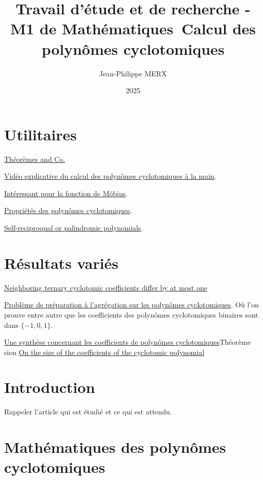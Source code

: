 \documentclass{article}
\newcounter{question}
\theoremstyle{break}                  %
\begin{document}
\title{Travail d'étude et de recherche - M1 de Mathématiques\
Calcul des polynômes cyclotomiques}
\author{Jean-Philippe MERX}
\date{2025}

\maketitle

\section*{Utilitaires}
\href{https://tex.stackexchange.com/questions/204411/getting-examples-to-look-like-theorems-lemmas-corollaries}{Théorèmes and Co.}


\href{https://www.youtube.com/watch?v=RLdHp_PB_x0}{Vidéo explicative du calcul des polynômes cyclotomiques à la main}.

\href{https://www.youtube.com/watch?v=gnBbm78jz0Y}{Intéressant pour la fonction de Möbius}.

\href{https://jacquescellier.fr/maths/polynomes_cyclotomiques.pdf}{Propriétés des polynômes cyclotomiques}.

\href{https://en.wikipedia.org/wiki/Reciprocal_polynomial}{Self-reciproqual or palindromic polynomials}.

\section*{Résultats variés}
\href{https://arxiv.org/pdf/0810.5496}{Neighboring ternary cyclotomic coefficients differ by at most one}

\href{https://webusers.imj-prg.fr/~pierre.charollois/Charollois_Pbme_cyclotomiques_agreg2015.pdf}{Problème de préparation à l'agrégation sur les polynômes cyclotomiques}. Où l'on prouve entre autre que les coefficients des polynômes cyclotomiques binaires sont dans $\{-1, 0, 1\}$.

\href{https://arxiv.org/pdf/2111.04034}{Une synthèse concernant les coefficients de polynômes cyclotomiques}Théorème
sion
\href{https://math.dartmouth.edu/~carlp/cyclo.pdf}{On the size of the coefficients of the cyclotomic polynomial}


\section*{Introduction}
Rappeler l'article qui est étudié et ce qui est attendu.

\section*{Mathématiques des polynômes cyclotomiques}
\end{document}
